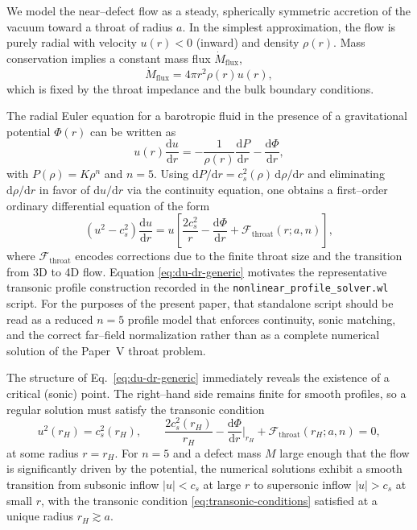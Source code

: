 \documentclass[11pt]{article}
\begin{document}
We model the near–defect flow as a steady, spherically symmetric accretion
of the vacuum toward a throat of radius \(a\).  In the simplest
approximation, the flow is purely radial with velocity \(u(r) < 0\) (inward)
and density \(\rho(r)\).  Mass conservation implies a constant mass flux
\(\dot{M}_{\text{flux}}\),
\begin{equation}
  \dot{M}_{\text{flux}}
  = 4\pi r^2 \rho(r) u(r),
  \label{eq:mass-flux}
\end{equation}
which is fixed by the throat impedance and the bulk boundary conditions.

The radial Euler equation for a barotropic fluid in the presence of a
gravitational potential \(\Phi(r)\) can be written as
\begin{equation}
  u(r) \frac{\mathrm{d}u}{\mathrm{d}r}
  = -\frac{1}{\rho(r)} \frac{\mathrm{d}P}{\mathrm{d}r}
    - \frac{\mathrm{d}\Phi}{\mathrm{d}r},
  \label{eq:euler-radial}
\end{equation}
with \(P(\rho) = K \rho^n\) and \(n=5\).  Using
\(\mathrm{d}P/\mathrm{d}r = c_s^2(\rho)\,\mathrm{d}\rho/\mathrm{d}r\) and
eliminating \(\mathrm{d}\rho/\mathrm{d}r\) in favor of \(\mathrm{d}u/\mathrm{d}r\)
via the continuity equation, one obtains a first–order ordinary differential
equation of the form
\begin{equation}
  \left( u^2 - c_s^2 \right) \frac{\mathrm{d}u}{\mathrm{d}r}
  = u \left[
      \frac{2 c_s^2}{r}
      - \frac{\mathrm{d}\Phi}{\mathrm{d}r}
      + \mathcal{F}_{\text{throat}}(r; a, n)
    \right],
  \label{eq:du-dr-generic}
\end{equation}
where \(\mathcal{F}_{\text{throat}}\) encodes corrections due to the finite
throat size and the transition from 3D to 4D flow.  Equation
\eqref{eq:du-dr-generic} motivates the representative transonic profile
construction recorded in the \texttt{nonlinear\_profile\_solver.wl} script.
For the purposes of the present paper, that standalone script should be read
as a reduced \(n=5\) profile model that enforces continuity, sonic matching,
and the correct far--field normalization rather than as a complete numerical
solution of the Paper~V throat problem.

The structure of Eq.~\eqref{eq:du-dr-generic} immediately reveals the
existence of a critical (sonic) point.  The right–hand side remains finite
for smooth profiles, so a regular solution must satisfy the transonic
condition
\begin{equation}
  u^2(r_H) = c_s^2(r_H),
  \qquad
  \frac{2 c_s^2(r_H)}{r_H}
  - \frac{\mathrm{d}\Phi}{\mathrm{d}r}\bigg|_{r_H}
  + \mathcal{F}_{\text{throat}}(r_H; a, n)
  = 0,
  \label{eq:transonic-conditions}
\end{equation}
at some radius \(r = r_H\).  For \(n=5\) and a defect mass \(M\) large
enough that the flow is significantly driven by the potential, the numerical
solutions exhibit a smooth transition from subsonic inflow
\(|u| < c_s\) at large \(r\) to supersonic inflow \(|u| > c_s\) at small
\(r\), with the transonic condition \eqref{eq:transonic-conditions} satisfied
at a unique radius \(r_H \gtrsim a\).
\end{document}
